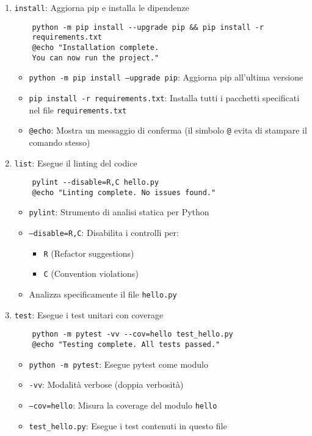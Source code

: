 \documentclass[a4paper,12pt]{article}
\begin{document}
\begin{enumerate}[leftmargin=*,label=\textbf{\arabic*.}]
    \item \texttt{install}: Aggiorna pip e installa le dipendenze
    \begin{lstlisting}
    python -m pip install --upgrade pip && pip install -r 
    requirements.txt
    @echo "Installation complete. 
    You can now run the project."
    \end{lstlisting}
    \begin{itemize}
        \item \texttt{python -m pip install --upgrade pip}: Aggiorna pip all'ultima versione
        \item \texttt{pip install -r requirements.txt}: Installa tutti i pacchetti specificati nel file \texttt{requirements.txt}
        \item \texttt{@echo}: Mostra un messaggio di conferma (il simbolo \texttt{@} evita di stampare il comando stesso)
    \end{itemize}
    
    \item \texttt{list}: Esegue il linting del codice
    \begin{lstlisting}
    pylint --disable=R,C hello.py
    @echo "Linting complete. No issues found."
    \end{lstlisting}
    \begin{itemize}
        \item \texttt{pylint}: Strumento di analisi statica per Python
        \item \texttt{--disable=R,C}: Disabilita i controlli per:
        \begin{itemize}
            \item \texttt{R} (Refactor suggestions)
            \item \texttt{C} (Convention violations)
        \end{itemize}
        \item Analizza specificamente il file \texttt{hello.py}
    \end{itemize}

    \item \texttt{test}: Esegue i test unitari con coverage
    \begin{lstlisting}
    python -m pytest -vv --cov=hello test_hello.py
    @echo "Testing complete. All tests passed."
    \end{lstlisting}
    \begin{itemize}
        \item \texttt{python -m pytest}: Esegue pytest come modulo
        \item \texttt{-vv}: Modalità verbose (doppia verbosità)
        \item \texttt{--cov=hello}: Misura la coverage del modulo \texttt{hello}
        \item \texttt{test\_hello.py}: Esegue i test contenuti in questo file
    \end{itemize}
\end{enumerate}
\end{document}
